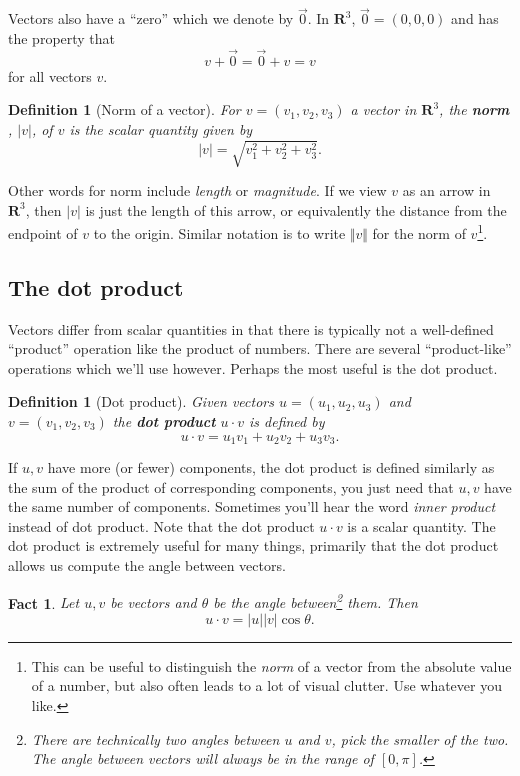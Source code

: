 \documentclass[12pt]{article}
\numberwithin{equation}{subsection}
\numberwithin{figure}{subsection}
\newtheorem{defn}[subsection]{Definition}
\newtheorem{fact}[subsection]{Fact}
\theoremstyle{note}
\begin{document}
{Vectors also have a ``zero'' which we denote by $\vec{0}$. In $\mathbf{R}^3$, $\vec{0}=(0,0,0)$ and has the property that \[ {v}+\vec{0}=\vec{0}+{v}={v}\] for all vectors ${v}$. 

\begin{defn}[Norm of a vector] For $v=(v_1,v_2,v_3)$ a vector in $\mathbf{R}^3$, the \textbf{norm} , $|v|$, of $v$ is the scalar quantity given by \begin{equation} |v|=\sqrt{v_1^2+v_2^2+v_3^2}.\end{equation}
\end{defn}

Other words for {norm} include \textit{length} or \textit{magnitude}. If we view $v$ as an arrow in $\mathbf{R}^3$, then $|v|$ is just the length of this arrow, or equivalently the distance from the endpoint of $v$ to the origin. Similar notation is to write $\Vert v \Vert$ for the norm of $v$\footnote{This can be useful to distinguish the \textit{norm} of a vector from the absolute value of a number, but also often leads to a lot of visual clutter. Use whatever you like.}.



\subsection{The dot product} Vectors differ from scalar quantities in that there is typically not a well-defined ``product'' operation like the product of numbers. There are several ``product-like'' operations which we'll use however. Perhaps the most useful is the {dot product}. 

\begin{defn}[Dot product] Given vectors $u=(u_1 ,u_2, u_3)$ and $v=(v_1,v_2,v_3)$ the \textbf{dot product} $u\cdot v$ is defined by \begin{equation} u\cdot v=u_1 v_1+u_2 v_2+u_3 v_3.\end{equation}
\end{defn}

If $u,v$ have more (or fewer) components, the dot product is defined similarly as the sum of the product of corresponding components, you just need that $u,v$ have the same number of components. Sometimes you'll hear the word \textit{inner product} instead of dot product. Note that the dot product $u\cdot v$ is a scalar quantity. The dot product is extremely useful for many things, primarily that the dot product allows us compute the angle between vectors. 

\begin{fact} Let $u,v$ be vectors and  $\theta$ be the angle between\footnote{There are technically two angles between $u$ and $v$, pick the smaller of the two. The angle between vectors will always be in the range of $[0,\pi]$.} them. Then \begin{equation}\label{dot-prod-angle} u\cdot v= |u| |v|\cos \theta.\end{equation}
\end{fact}

}
\end{document}
